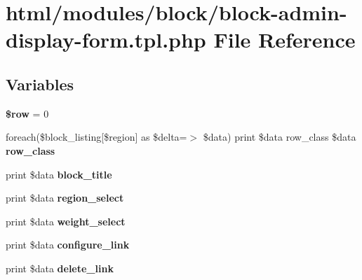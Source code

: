 \hypertarget{block-admin-display-form_8tpl_8php}{
\section{html/modules/block/block-\/admin-\/display-\/form.tpl.php File Reference}
\label{block-admin-display-form_8tpl_8php}
}
\subsection*{Variables}
\begin{DoxyCompactItemize}
\item 
\hypertarget{block-admin-display-form_8tpl_8php_aa1d731aa570613e5bcff831bb10e9b87}{
{\bfseries \$row} = 0}
\label{block-admin-display-form_8tpl_8php_aa1d731aa570613e5bcff831bb10e9b87}

\item 
\hypertarget{block-admin-display-form_8tpl_8php_a67d2c28c51080109034a41a89093b8a5}{
foreach(\$block\_\-listing\mbox{[}\$region\mbox{]} as \$delta=$>$ \$data) print \$data row\_\-class \$data {\bfseries row\_\-class}}
\label{block-admin-display-form_8tpl_8php_a67d2c28c51080109034a41a89093b8a5}

\item 
\hypertarget{block-admin-display-form_8tpl_8php_ae6f124c3cfec71296c1effa62aa1f702}{
print \$data {\bfseries block\_\-title}}
\label{block-admin-display-form_8tpl_8php_ae6f124c3cfec71296c1effa62aa1f702}

\item 
\hypertarget{block-admin-display-form_8tpl_8php_a4b2728655aa79683aba2c2a202a7aca8}{
print \$data {\bfseries region\_\-select}}
\label{block-admin-display-form_8tpl_8php_a4b2728655aa79683aba2c2a202a7aca8}

\item 
\hypertarget{block-admin-display-form_8tpl_8php_a1317c2a993afcc9094c904696bf545a3}{
print \$data {\bfseries weight\_\-select}}
\label{block-admin-display-form_8tpl_8php_a1317c2a993afcc9094c904696bf545a3}

\item 
\hypertarget{block-admin-display-form_8tpl_8php_a3b905d71bafd9f290185e863d5ecbb74}{
print \$data {\bfseries configure\_\-link}}
\label{block-admin-display-form_8tpl_8php_a3b905d71bafd9f290185e863d5ecbb74}

\item 
\hypertarget{block-admin-display-form_8tpl_8php_a023a97f76e36659b1f43c5162246e185}{
print \$data {\bfseries delete\_\-link}}
\label{block-admin-display-form_8tpl_8php_a023a97f76e36659b1f43c5162246e185}


\end{DoxyCompactItemize}
